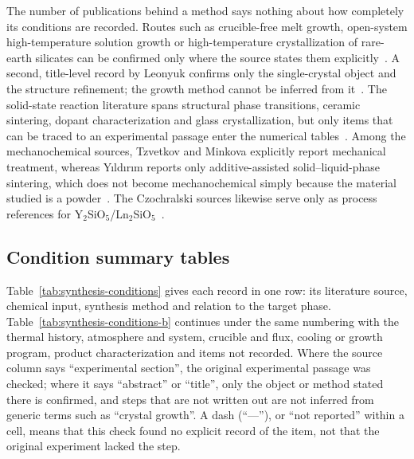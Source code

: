 The number of publications behind a method says nothing about how completely its conditions are recorded. Routes such as crucible-free melt growth, open-system high-temperature solution growth or high-temperature crystallization of rare-earth silicates can be confirmed only where the source states them explicitly~\cite{christensen1994investigation,ababaikeri2024ba3zn4si4o15,leonyuk1999high,giess1982zn2sio4}. A second, title-level record by Leonyuk confirms only the single-crystal object and the structure refinement; the growth method cannot be inferred from it~\cite{leonyuk1999crystal}. The solid-state reaction literature spans structural phase transitions, ceramic sintering, dopant characterization and glass crystallization, but only items that can be traced to an experimental passage enter the numerical tables~\cite{lin1999phase,zou2021crystal,kerstan2012thermal,cai2024optimized,zhao2026crystal,tejas2024structural,pires2001luminescence,kerstan2015kristallphasen}. Among the mechanochemical sources, Tzvetkov and Minkova explicitly report mechanical treatment, whereas Yıldırım reports only additive-assisted solid--liquid-phase sintering, which does not become mechanochemical simply because the material studied is a powder~\cite{tzvetkov2001effects,yldrm2009y2sio5}. The Czochralski sources likewise serve only as process references for Y$_2$SiO$_5$\slash Ln$_2$SiO$_5$~\cite{pang2005study,alizadeh2021spectroscopy,shoudu1999czochralski,brandle1986czochralski}.

\subsection{Condition summary tables}

Table~\ref{tab:synthesis-conditions} gives each record in one row: its literature source, chemical input, synthesis method and relation to the target phase. Table~\ref{tab:synthesis-conditions-b} continues under the same numbering with the thermal history, atmosphere and system, crucible and flux, cooling or growth program, product characterization and items not recorded. Where the source column says ``experimental section'', the original experimental passage was checked; where it says ``abstract'' or ``title'', only the object or method stated there is confirmed, and steps that are not written out are not inferred from generic terms such as ``crystal growth''. A dash (``—''), or ``not reported'' within a cell, means that this check found no explicit record of the item, not that the original experiment lacked the step.


